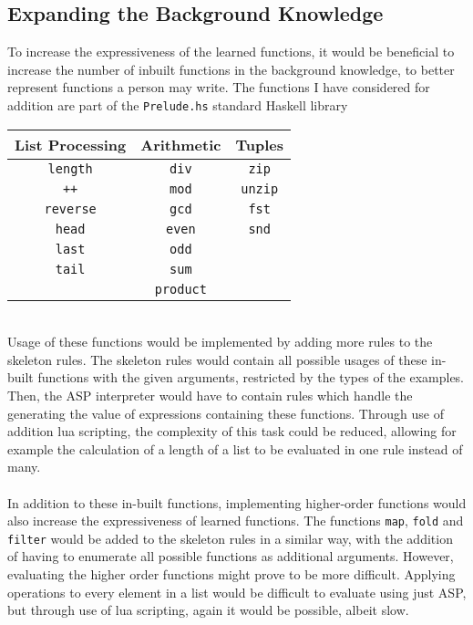 \subsection{Expanding the Background Knowledge}
To increase the expressiveness of the learned functions, it would be beneficial to increase the number of inbuilt functions in the background knowledge, to better represent functions a person may write. The functions I have considered for addition are part of the \lstinline{Prelude.hs} standard Haskell library %
\begin{center}
\begin{tabular}{ c | c | c }
\textbf{List Processing} & \textbf{Arithmetic} & \textbf{Tuples} \\
\hline
\lstinline!length!
& 
\lstinline!div!
& 
\lstinline!zip!
\\
\lstinline!++!
& 
\lstinline!mod!
&
\lstinline!unzip!
\\
\lstinline!reverse!
& 
\lstinline!gcd!
& 
\lstinline!fst!
\\
\lstinline!head!
& 
\lstinline!even!
& 
\lstinline!snd!
\\
\lstinline!last!
& 
\lstinline!odd!
& \\
\lstinline!tail!
&
\lstinline!sum!
& \\
&
\lstinline!product!
& 
\end{tabular}
\end{center}
\mbox{} \\
Usage of these functions would be implemented by adding more rules to the skeleton rules. The skeleton rules would contain all possible usages of these in-built functions with the given arguments, restricted by the types of the examples. Then, the ASP interpreter would have to contain rules which handle the generating the value of expressions containing these functions. Through use of addition lua scripting, the complexity of this task could be reduced, allowing for example the calculation of a length of a list to be evaluated in one rule instead of many.\\ \\
In addition to these in-built functions, implementing higher-order functions would also increase the expressiveness of learned functions. The functions \lstinline{map}, \lstinline{fold} and \lstinline{filter} would be added to the skeleton rules in a similar way, with the addition of having to enumerate all possible functions as additional arguments. However, evaluating the higher order functions might prove to be more difficult. Applying operations to every element in a list would be difficult to evaluate using just ASP, but through use of lua scripting, again it would be possible, albeit slow. %

